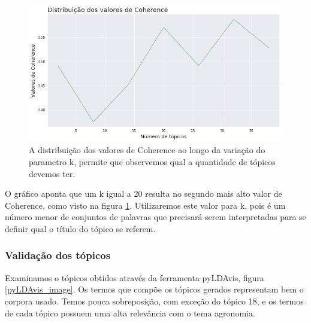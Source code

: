 \begin{figure}[ht!]
	\centering
	\includegraphics[scale=0.6]{imagens/distr_dos_valores_de_coherence.png}
	\caption{A distribuição dos valores de Coherence ao longo da variação do parametro k, permite que observemos qual a quantidade de tópicos devemos ter.
			 \label{dist_coherence_image}}
\end{figure}

O gráfico aponta que um k igual a 20 resulta no segundo mais alto valor de Coherence, como visto na figura \ref{dist_coherence_image}. Utilizaremos este valor para k, pois é um número menor de conjuntos de palavras que precisará serem interpretadas para se definir qual o título do tópico se referem.

\subsubsection{Validação dos tópicos}

Examinamos o tópicos obtidos através da ferramenta pyLDAvis, figura \ref{pyLDAvis_image}. Os termos que compõe os tópicos gerados  representam bem o corpora usado. Temos pouca sobreposição, com exceção do tópico 18, e os termos de cada tópico possuem uma alta relevância com o tema agronomia.  

